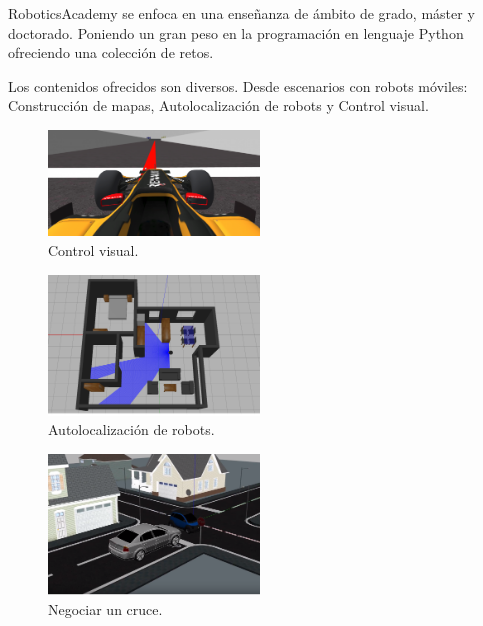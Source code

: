 \documentclass[a4paper, 12pt]{book}
\begin{document}
RoboticsAcademy se enfoca en una enseñanza de ámbito de grado, máster y doctorado. Poniendo un gran peso en la programación en lenguaje Python ofreciendo una colección de retos.

Los contenidos ofrecidos son diversos. Desde escenarios con robots móviles: Construcción de mapas, Autolocalización de robots y Control visual.
\begin{figure}[H]
	\centering
	\includegraphics[width=0.5\textwidth]{img/control_visual}
	\caption{Control visual.}
\end{figure}
\begin{figure}[H]
	\centering
	\includegraphics[width=0.5\textwidth]{img/auto_loc}
	\caption{Autolocalización de robots.}
\end{figure}
\begin{figure}[H]
	\centering
	\includegraphics[width=0.5\textwidth]{img/cruce}
	\caption{Negociar un cruce.}
\end{figure}
\end{document}
